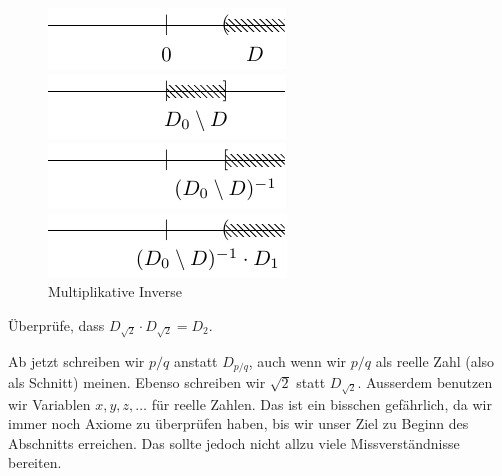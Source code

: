 \documentclass[../main.tex]{subfiles}
\begin{document}
\begin{figure}[htb]
  \centering
  \begin{minipage}{0.4\linewidth}
    \centering
    \includegraphics{images/dedekind-multiplikativ-invers1}
  \end{minipage}%
  \begin{minipage}{0.4\linewidth}
    \centering
    \includegraphics{images/dedekind-multiplikativ-invers2}
  \end{minipage}
  \begin{minipage}{0.4\linewidth}
    \centering
    \includegraphics{images/dedekind-multiplikativ-invers3}
  \end{minipage}%
  \begin{minipage}{0.4\linewidth}
    \centering
    \includegraphics{images/dedekind-multiplikativ-invers4}
  \end{minipage}%
  \caption{Multiplikative Inverse}%
  \label{fig:multiplikativ-dedekind}
\end{figure}

\begin{exercise}
  Überprüfe, dass $D_{\sqrt 2} \cdot D_{\sqrt 2} = D_{2}$.
\end{exercise}

\begin{remark}
  Ab jetzt schreiben wir $p/q$ anstatt $D_{p/q}$,
  auch wenn wir $p/q$ als reelle Zahl (also als Schnitt)
  meinen.
  Ebenso schreiben wir $\sqrt 2$ statt $D_{\sqrt 2}$.
  Ausserdem benutzen wir Variablen $x,y,z, \dots$
  für reelle Zahlen.
  Das ist ein bisschen gefährlich, da wir immer noch
  Axiome zu überprüfen haben, bis wir unser Ziel zu Beginn
  des Abschnitts erreichen. Das sollte jedoch nicht allzu
  viele Missverständnisse bereiten.
\end{remark}
\end{document}
